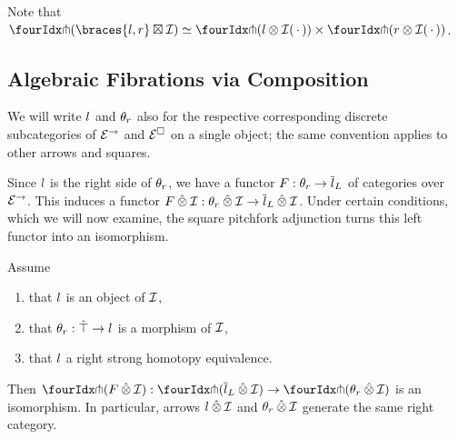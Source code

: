 \documentclass[reqno,10pt,a4paper,oneside]{amsart}
\begin{document}
Note that $\liftr{(\braces{\intervall, \intervalr} \boxtimes \cal{I})} \simeq \liftr{(l \otimes \cal{I}\brarghole)} \times \liftr{(r \otimes \cal{I}\brarghole)}$.

\subsection{Algebraic Fibrations via Composition}

We will write $\intervall$ and $\thetar$ also for the respective corresponding discrete subcategories of $\catE^{\to}$ and $\catE^{\Box}$ on a single object; the same convention applies to other arrows and squares.

Since $\intervall$ is the right side of $\thetar$, we have a functor $F : \thetar \to \overline{\intervall}_L$ of categories over $\catE^{\to}$.
This induces a functor $F \hatotimes \cal{I} : \thetar \hatotimes \cal{I} \to \overline{\intervall}_L \hatotimes \cal{I}$.
Under certain conditions, which we will now examine, the square pitchfork adjunction turns this left functor into an isomorphism.

\begin{lemma}
\label{filling-vs-composition}
Assume
\begin{enumerate}
\item
that $\intervall$ is an object of $\cal{I}$,
\item
that $\thetar : \hatunit \to \intervall$ is a morphism of $\cal{I}$,
\item
that $\intervall$ a right strong homotopy equivalence.
\end{enumerate}
Then $\liftr{(F \hatotimes \cal{I})} : \liftr{(\overline{\intervall}_L \hatotimes \cal{I})} \to \liftr{(\thetar \hatotimes \cal{I})}$ is an isomorphism.
In particular, arrows $\intervall \hatotimes \cal{I}$ and $\thetar \hatotimes \cal{I}$ generate the same right category.
\end{lemma}
\end{document}
